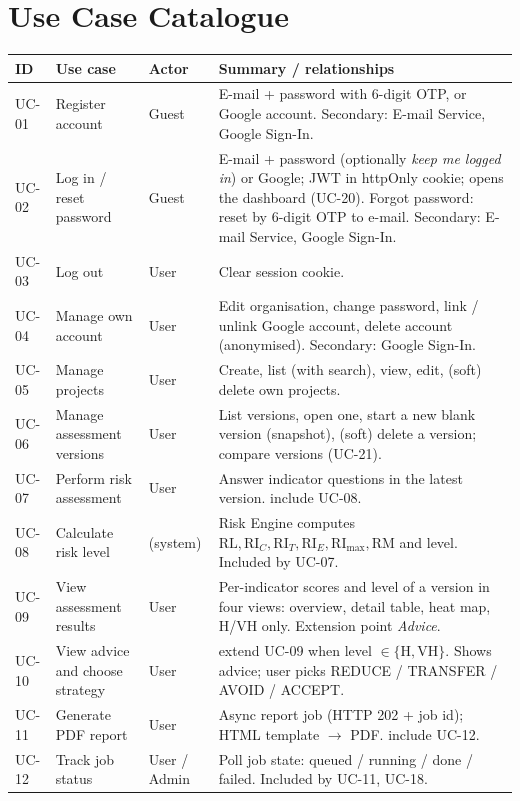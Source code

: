 \documentclass[11pt,a4paper]{article}
\newcommand{\RL}{\mathrm{RL}}
\newcommand{\RIC}{\mathrm{RI}_{C}}
\newcommand{\RIT}{\mathrm{RI}_{T}}
\newcommand{\RIE}{\mathrm{RI}_{E}}
\newcommand{\RImax}{\mathrm{RI}_{\max}}
\newcommand{\RM}{\mathrm{RM}}
\newcommand{\inc}{\guillemotleft include\guillemotright}
\newcommand{\ext}{\guillemotleft extend\guillemotright}
\newcommand{\lv}[1]{\mathrm{#1}}
\begin{document}
\clearpage
\section{Use Case Catalogue}
\begingroup\small
\begin{longtable}{@{}l R{4.2cm} l R{7.0cm}@{}}
\toprule
{}ID & Use case & Actor & Summary / relationships \\
\midrule
\endhead
UC-01 & Register account & Guest & E-mail + password with 6-digit OTP, or Google account. Secondary: E-mail Service, Google Sign-In. \\
UC-02 & Log in / reset password & Guest & E-mail + password (optionally \emph{keep me logged in}) or Google; JWT in httpOnly cookie; opens the dashboard (UC-20). Forgot password: reset by 6-digit OTP to e-mail. Secondary: E-mail Service, Google Sign-In. \\
UC-03 & Log out & User & Clear session cookie. \\
UC-04 & Manage own account & User & Edit organisation, change password, link / unlink Google account, delete account (anonymised). Secondary: Google Sign-In. \\
UC-05 & Manage projects & User & Create, list (with search), view, edit, (soft) delete own projects. \\
UC-06 & Manage assessment versions & User & List versions, open one, start a new blank version (snapshot), (soft) delete a version; compare versions (UC-21). \\
UC-07 & Perform risk assessment & User & Answer indicator questions in the latest version. \inc{} UC-08. \\
UC-08 & Calculate risk level & (system) & Risk Engine computes $\RL,\RIC,\RIT,\RIE,\RImax,\RM$ and level. Included by UC-07. \\
UC-09 & View assessment results & User & Per-indicator scores and level of a version in four views: overview, detail table, heat map, H/VH only. Extension point \emph{Advice}. \\
UC-10 & View advice and choose strategy & User & \ext{} UC-09 when level $\in\{\lv{H},\lv{VH}\}$. Shows advice; user picks REDUCE / TRANSFER / AVOID / ACCEPT. \\
UC-11 & Generate PDF report & User & Async report job (HTTP 202 + job id); HTML template $\to$ PDF. \inc{} UC-12. \\
UC-12 & Track job status & User / Admin & Poll job state: queued / running / done / failed. Included by UC-11, UC-18. \\

\end{longtable}
\end{document}
